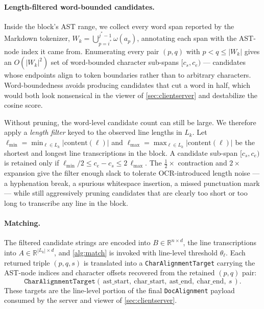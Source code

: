 \documentclass{article}
\theoremstyle{definition}
\begin{document}
\paragraph{Length-filtered word-bounded candidates.}
Inside the block's AST range, we collect every word span reported by
the Markdown tokenizer,
$W_k = \bigcup_{p = i^{*}}^{j^{*}-1} \omega(a_p)$, annotating each
span with the AST-node index it came from.  Enumerating every pair
$(p, q)$ with $p < q \le |W_k|$ gives an $O(|W_k|^2)$ set of
word-bounded character sub-spans $[c_s, c_e)$ --- candidates whose
endpoints align to token boundaries rather than to arbitrary
characters.  Word-boundedness avoids producing candidates that cut a
word in half, which would both look nonsensical in the viewer of
\cref{sec:clientserver} and destabilize the cosine score.

Without pruning, the word-level candidate count can still be large.
We therefore apply a \emph{length filter} keyed to the observed line
lengths in $L_k$.  Let
$\ell_{\min} = \min_{\ell \in L_k} |\mathrm{content}(\ell)|$ and
$\ell_{\max} = \max_{\ell \in L_k} |\mathrm{content}(\ell)|$ be the
shortest and longest line transcriptions in the block.  A candidate
sub-span $[c_s, c_e)$ is retained only if
$\ell_{\min} / 2 \le c_e - c_s \le 2\,\ell_{\max}$.  The
$\tfrac{1}{2}\times$ contraction and $2\times$ expansion give the
filter enough slack to tolerate OCR-introduced length noise --- a
hyphenation break, a spurious whitespace insertion, a missed
punctuation mark --- while still aggressively pruning candidates that
are clearly too short or too long to transcribe any line in the
block.

\paragraph{Matching.}
The filtered candidate strings are encoded into
$B \in \mathbb{R}^{n \times d}$, the line transcriptions into
$A \in \mathbb{R}^{|L_k| \times d}$, and \cref{alg:match} is invoked
with line-level threshold $\theta_\ell$.  Each returned triple
$(p, q, s)$ is translated into a
\texttt{CharAlignmentTarget} carrying the AST-node indices and
character offsets recovered from the retained $(p, q)$ pair:
\[
      \texttt{CharAlignmentTarget}
      (\,\text{ast\_start},\ \text{char\_start},\
      \text{ast\_end},\ \text{char\_end},\ s\,).
\]
These targets are the line-level portion of the final
\texttt{DocAlignment} payload consumed by the server and viewer of
\cref{sec:clientserver}.
\end{document}
